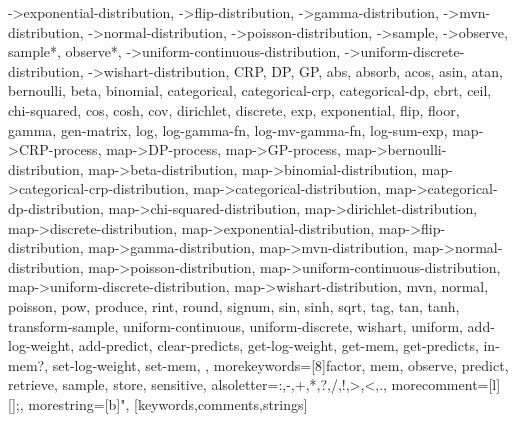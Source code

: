 {{    ->exponential-distribution, ->flip-distribution, ->gamma-distribution, %
    ->mvn-distribution, ->normal-distribution, ->poisson-distribution, %
    ->sample, ->observe, sample*, observe*, %
    ->uniform-continuous-distribution, ->uniform-discrete-distribution, %
    ->wishart-distribution, CRP, DP, GP, abs, absorb, acos, asin, atan, %
    bernoulli, beta, binomial, categorical, categorical-crp, categorical-dp, %
    cbrt, ceil, chi-squared, cos, cosh, cov, dirichlet, discrete, exp, %
    exponential, flip, floor, gamma, gen-matrix, log, log-gamma-fn, %
    log-mv-gamma-fn, log-sum-exp, map->CRP-process, map->DP-process, %
    map->GP-process, map->bernoulli-distribution, map->beta-distribution, %
    map->binomial-distribution, map->categorical-crp-distribution, %
    map->categorical-distribution, map->categorical-dp-distribution, %
    map->chi-squared-distribution, map->dirichlet-distribution, %
    map->discrete-distribution, map->exponential-distribution, %
    map->flip-distribution, map->gamma-distribution, map->mvn-distribution, %
    map->normal-distribution, map->poisson-distribution, %
    map->uniform-continuous-distribution, map->uniform-discrete-distribution, %
    map->wishart-distribution, mvn, normal, poisson, pow, produce, %
    rint, round, signum, sin, sinh, sqrt, tag, tan, tanh, transform-sample, %
    uniform-continuous, uniform-discrete, wishart, uniform, %
    add-log-weight, add-predict, clear-predicts, get-log-weight, %
    get-mem, get-predicts, in-mem?, set-log-weight, set-mem, %
  }, %
  morekeywords=[8]{factor, mem, observe, predict, retrieve, sample, store}, %
  sensitive, %
  alsoletter={:,-,+,*,?,/,!,>,<,.}, %
  morecomment=[l][\color{gray}]{;}, %
  morestring=[b]", %
}[keywords,comments,strings]
 
